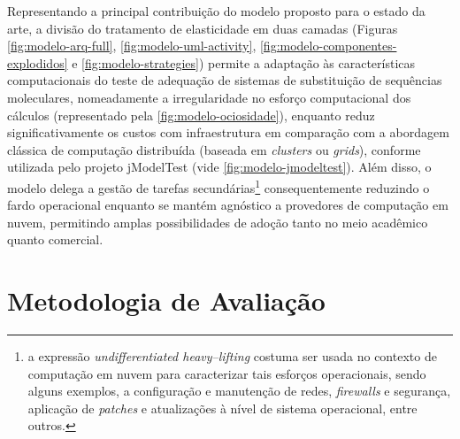 \documentclass[english,brazilian]{UNISINOSmonografia} %
\begin{document}
Representando a principal contribuição do modelo proposto para o estado da arte, a divisão do tratamento de elasticidade em duas camadas (Figuras \ref{fig:modelo-arq-full}, \ref{fig:modelo-uml-activity}, \ref{fig:modelo-componentes-explodidos} e \ref{fig:modelo-strategies}) permite a adaptação às características computacionais do teste de adequação de sistemas de substituição de sequências moleculares, nomeadamente a irregularidade no esforço computacional dos cálculos (representado pela \autoref{fig:modelo-ociosidade}), enquanto reduz significativamente os custos com infraestrutura em comparação com a abordagem clássica de computação distribuída (baseada em \textit{clusters} ou \textit{grids}), conforme utilizada pelo projeto jModelTest (vide \autoref{fig:modelo-jmodeltest}).
Além disso, o modelo delega a gestão de tarefas secundárias\footnote{
	a expressão \textit{undifferentiated heavy--lifting} costuma ser usada no contexto de computação em nuvem para caracterizar tais esforços operacionais, sendo alguns exemplos, a configuração e manutenção de redes, \textit{firewalls} e segurança, aplicação de \textit{patches} e atualizações à nível de sistema operacional, entre outros.
} consequentemente reduzindo o fardo operacional enquanto se mantém agnóstico a provedores de computação em nuvem, permitindo amplas possibilidades de adoção tanto no meio acadêmico quanto comercial.













\chapter{Metodologia de Avaliação}
\label{ch:modelo-metodologia}


\end{document}

